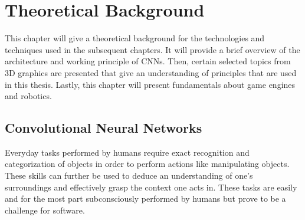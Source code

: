 

\chapter{Theoretical Background}
This chapter will give a theoretical background for the technologies and techniques used in the subsequent chapters. It will provide a brief overview of the architecture and working principle of \acp{CNN}. Then, certain selected topics from 3D graphics are presented that give an understanding of principles that are used in this thesis. Lastly, this chapter will present fundamentals about game engines and robotics.

\section{Convolutional Neural Networks}
Everyday tasks performed by humans require exact recognition and categorization of objects in order to perform actions like manipulating objects. 
These skills can further be used to deduce an understanding of one's surroundings and effectively grasp the context one acts in. These tasks are easily and for the most part subconsciously performed by humans but prove to be a challenge for software.\
